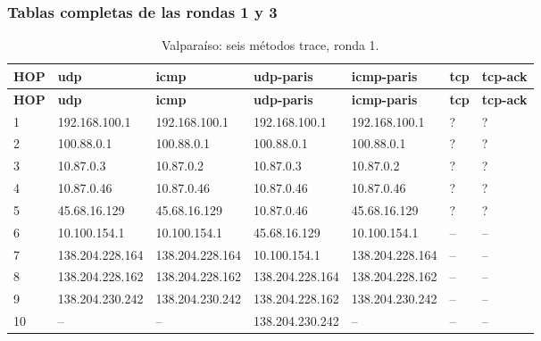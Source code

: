 \subsubsection{Tablas completas de las rondas 1 y 3}
\begin{landscape}
\begingroup
\fontsize{9}{11}\selectfont
\begin{longtable}{p{0.95cm}p{3.725cm}p{3.725cm}p{3.725cm}p{3.725cm}p{3.725cm}p{3.725cm}}
\caption{Valparaíso: seis métodos trace, ronda 1.}\label{anexo:trace:138.204.230.242:1} \\
\toprule
\textbf{HOP} & \textbf{udp} & \textbf{icmp} & \textbf{udp-paris} & \textbf{icmp-paris} & \textbf{tcp} & \textbf{tcp-ack} \\ \midrule
\endfirsthead
\toprule
\textbf{HOP} & \textbf{udp} & \textbf{icmp} & \textbf{udp-paris} & \textbf{icmp-paris} & \textbf{tcp} & \textbf{tcp-ack} \\ \midrule
\endhead
1 & 192.168.100.1 & 192.168.100.1 & 192.168.100.1 & 192.168.100.1 & ? & ? \\
2 & 100.88.0.1 & 100.88.0.1 & 100.88.0.1 & 100.88.0.1 & ? & ? \\
3 & 10.87.0.3 & 10.87.0.2 & 10.87.0.3 & 10.87.0.2 & ? & ? \\
4 & 10.87.0.46 & 10.87.0.46 & 10.87.0.46 & 10.87.0.46 & ? & ? \\
5 & 45.68.16.129 & 45.68.16.129 & 10.87.0.46 & 45.68.16.129 & ? & ? \\
6 & 10.100.154.1 & 10.100.154.1 & 45.68.16.129 & 10.100.154.1 & -- & -- \\
7 & 138.204.228.164 & 138.204.228.164 & 10.100.154.1 & 138.204.228.164 & -- & -- \\
8 & 138.204.228.162 & 138.204.228.162 & 138.204.228.164 & 138.204.228.162 & -- & -- \\
9 & 138.204.230.242 & 138.204.230.242 & 138.204.228.162 & 138.204.230.242 & -- & -- \\
10 & -- & -- & 138.204.230.242 & -- & -- & -- \\
\bottomrule
\end{longtable}
\endgroup
\end{landscape}
\begingroup
\fontsize{9}{11}\selectfont
